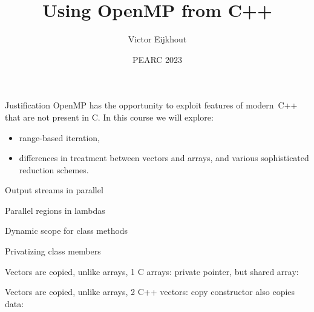 \documentclass[10pt]{beamer}
\begin{document}
\title[OMP \& C++]{Using OpenMP from C++}
\author[Eijkhout]{Victor Eijkhout}
\date{PEARC 2023}

\maketitle

\begin{frame}{Justification}
  OpenMP has the opportunity to exploit features of modern~C++
  that are not present in C.
  In this course we will explore:
  \begin{itemize}
  \item
    range-based iteration,
  \item
    differences in treatment between vectors and arrays,
    and various sophisticated reduction schemes.
  \end{itemize}

\end{frame}


\begin{numberedframe}{Output streams in parallel}
  
\end{numberedframe}

\begin{numberedframe}{Parallel regions in lambdas}
  
\end{numberedframe}

\begin{numberedframe}{Dynamic scope for class methods}
  \def\snippetoutputsize{\footnotesize}
  
\end{numberedframe}

\begin{numberedframe}{Privatizing class members}
  
\end{numberedframe}

\begin{numberedframe}{Vectors are copied, unlike arrays, 1}
  C arrays: private pointer, but shared array:
\end{numberedframe}

\begin{numberedframe}{Vectors are copied, unlike arrays, 2}
  C++ vectors: copy constructor also copies data:
\end{numberedframe}
\end{document}
